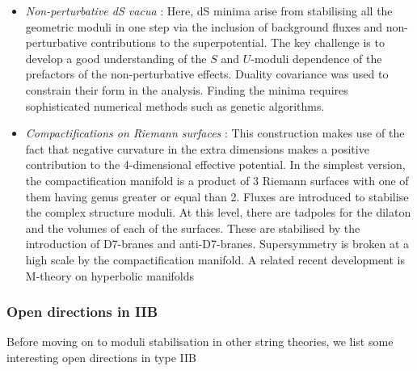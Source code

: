 \begin{itemize}
\item {\it Non-perturbative dS vacua} \cite{Blaback:2013qza}:  Here, dS minima arise from stabilising all the geometric moduli in  one step via the inclusion of  background fluxes and non-perturbative contributions to the superpotential. The key challenge is to develop a good understanding of the $S$ and $U$-moduli dependence of the prefactors of the non-perturbative effects. Duality covariance was used to constrain their form in the analysis. Finding the minima requires sophisticated numerical methods such as genetic algorithms.

\item {\it  Compactifications on Riemann surfaces }\cite{Saltman:2004jh}: This construction makes use of the fact that negative curvature in the 
extra dimensions makes a positive contribution to the 4-dimensional effective potential. In the simplest version, the compactification manifold is a product of 3 Riemann surfaces with one of them having genus greater or equal than 2.
Fluxes are introduced to stabilise the complex structure moduli. At this level, there are  tadpoles for the dilaton and the volumes of each of the surfaces. These are stabilised by the introduction of D7-branes and anti-D7-branes. Supersymmetry is broken at a high scale by the compactification manifold. A related recent development is M-theory on hyperbolic manifolds \cite{DeLuca:2021pej}

\end{itemize}

\subsubsection{Open directions in IIB}

Before moving on to moduli stabilisation in other string theories, we list some interesting open directions in type IIB


